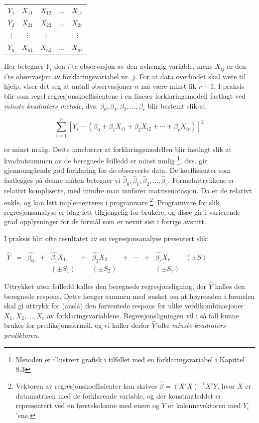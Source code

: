 \begin{center}
\begin{tabular}{ccccc}
 $Y_1$&$X_{11}$&$X_{12}$&$\ldots$&$X_{1r}$ \\
 $Y_2$&$X_{21}$&$X_{22}$&$\ldots$&$X_{2r}$ \\
 $\vdots$&$\vdots$&$\vdots$&$   $&$\vdots $ \\
 $Y_n$&$X_{n1}$&$X_{n2}$&$\ldots$&$X_{nr}$ 
\end{tabular}
\end{center}
Her betegner $Y_i$ den $i$'te observasjon av den avhengig variable, mens
$X_{ij}$ er den i'te observasjon av forklaringsvariabel nr. $j$.
For at data overhodet skal være til hjelp, viser det seg at antall
observasjoner $n$ må være minst lik $r+1$. 
I praksis blir som regel regresjonskoeffisientene i en lineær
forklaringsmodell fastlagt ved {\em minste kvadraters metode}, dvs.
${\beta}_0, {\beta}_1, {\beta}_2, \ldots , {\beta}_r $ blir bestemt slik at

\[  \sum_{i=1}^n {[Y_i-({\beta}_0 + {\beta}_1X_{i1} + {\beta}_2X_{i2} +
                 \cdots  + {\beta}_rX_{ir})]}^2     \]

\noindent er minst mulig.  Dette innebærer at forklaringsmodellen blir
fastlagt slik at kvadratsummen av de beregnede feilledd er minst mulig
  \footnote{Metoden er illustrert grafisk i tilfellet med en forklaringsvariabel i 
Kapittel 8.3}, dvs. gir gjennomgående god forklaring for de observerte
data.  De koeffisienter som fastlegges på denne måten betegner vi
$\hat{{\beta}}_0, \hat{{\beta}}_1, \hat{{\beta}}_2, \ldots , \hat{{\beta}}_r.$
Formeluttrykkene er relativt kompliserte, med mindre man innfører
matrisenotasjon. Da er de relativt enkle, og kan lett implementeres i programvare
\footnote{Vektoren av regresjonskoeffisienter kan skrives
 $\hat{\beta} = {(X'X)}^{-1}X'Y$, hvor $X$ er datamatrisen med de forklarende
variable, og der konstantleddet er representert ved en førstekolonne med
enere og $Y$ er kolonnevektoren med $Y_i$'ene.}.
Programvare for slik regresjonsanalyse er idag lett tilgjengelig
for brukere, og disse gir i varierende grad opplysninger for de formål
som er nevnt sist i forrige avsnitt.

I praksis blir ofte resultatet av en regresjonsanalyse presentert slik:

\begin{center} $
 \begin{array}{cccccccccccc}
 \hat{Y}&=&\hat{{\beta}_0}&+&\hat{{\beta}_1}X_1&+&\hat{{\beta}_2}X_2&+&
                           \cdots &+&\hat{{\beta}_r}X_r &(\pm S) \\
        & & &   &(\pm S_1)& &(\pm S_2)& & & &(\pm S_r) & 
 \end{array} $
\end{center}
\noindent Uttrykket uten feilledd kalles den beregnede regresjonsligning, 
der $\hat{Y}$ kalles den beregnede respons.
Dette henger sammen med ønsket om at høyresiden i formelen skal gi
 uttrykk for (anslå) den forventede respons for ulike
 verdi\-kom\-binasjoner $X_1, X_2, \ldots, X_r $ av forklaringsvariablene.
Regresjonsligningen vil i så fall kunne brukes for prediksjonsformål,
og vi kaller derfor $\hat{Y}$ ofte {\em minste kvadraters prediktoren}.

